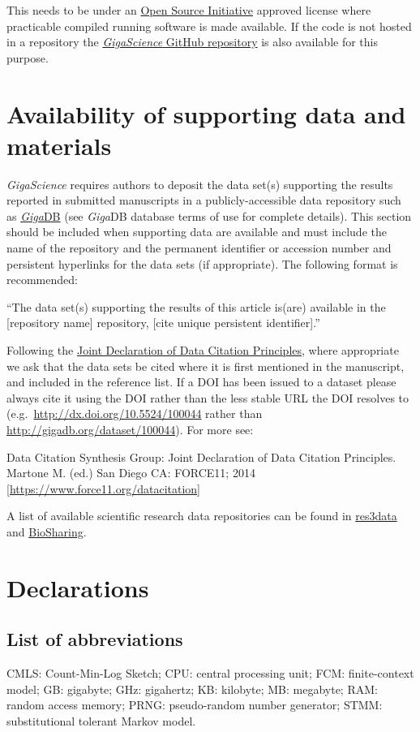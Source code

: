 \documentclass[a4paper,num-refs]{oup-contemporary}
\begin{document}
This needs to be under an \href{http:/opensource.org/licenses}{Open Source Initiative} approved license where practicable compiled running software is made available. If the code is not hosted in a repository the \href{https://github.com/gigascience}{\textit{GigaScience} GitHub repository} is also available for this purpose.

\section{Availability of supporting data and materials}

\textit{GigaScience} requires authors to deposit the data set(s) supporting the results reported in submitted manuscripts in a publicly-accessible data repository such as \href{http://gigadb.org/}{\textit{Giga}DB} (see \textit{Giga}DB database terms of use for complete details). This section should be included when supporting data are available and must include the name of the repository and the permanent identifier or accession number and persistent hyperlinks for the data sets (if appropriate). The following format is recommended:

``The data set(s) supporting the results of this article is(are) available in the [repository name] repository, [cite unique persistent identifier].''

Following the \href{https://www.force11.org/group/joint-declaration-data-citation-principles-final}{Joint Declaration of Data Citation Principles}, where appropriate we ask that the data sets be cited where it is first mentioned in the manuscript, and included in the reference list. If a DOI has been issued to a dataset please always cite it using the DOI rather than the less stable URL the DOI resolves to (e.g.~\url{http://dx.doi.org/10.5524/100044} rather than \url{http://gigadb.org/dataset/100044}). For more see:

Data Citation Synthesis Group: Joint Declaration of Data Citation Principles. Martone M. (ed.) San Diego CA: FORCE11; 2014 [\url{https://www.force11.org/datacitation}]

A list of available scientific research data repositories can be found in \href{http://www.re3data.org/}{res3data} and \href{https://biosharing.org/}{BioSharing}.

\section{Declarations}

\subsection{List of abbreviations}
CMLS: Count-Min-Log Sketch; CPU: central processing unit; FCM: finite-context model; GB: gigabyte; GHz: gigahertz; KB: kilobyte; MB: megabyte; RAM: random access memory; PRNG: pseudo-random number generator; STMM: substitutional tolerant Markov model.
\end{document}
